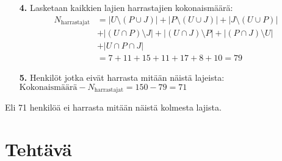 \documentclass{article}
\newcounter{tehtava}
\begin{document}
\begin{itemize}
\begin{itemize}
        \item[\textbf{4.}]Lasketaan kaikkien lajien harrastajien kokonaismäärä:
        \[
            \begin{aligned}
                N_{\text{harrastajat}} &= |U \setminus (P \cup J)| + |P \setminus (U \cup J)| + |J \setminus (U \cup P)| \\
                &+ |(U \cap P) \setminus J| + |(U \cap J) \setminus P| + |(P \cap J) \setminus U| \\
                &+ |U \cap P \cap J| \\
                &= 7 + 11 + 15 + 11 + 17 + 8 + 10 = 79
            \end{aligned}
        \]
        \item[\textbf{5.}]Henkilöt jotka eivät harrasta mitään näistä lajeista:\newline
        $\text{Kokonaismäärä} - N_{\text{harrastajat}} = 150 - 79 = 71$
    \end{itemize}
    Eli 71 henkilöä ei harrasta mitään näistä kolmesta lajista.
\end{itemize}


\newpage
{}
\section*{Tehtävä \thetehtava}
\end{document}
